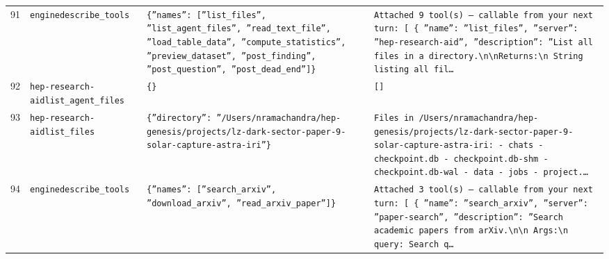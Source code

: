 \documentclass[11pt,a4paper]{article}
\begin{document}
\begin{longtable}{@{}p{}p{}p{}p{}@{}}
91 & \texttt{engine}\newline\texttt{describe\_\allowbreak{}tools} & \texttt{\{''names'':\allowbreak{} [''list\_\allowbreak{}files'',\allowbreak{} ''list\_\allowbreak{}agent\_\allowbreak{}files'',\allowbreak{} ''read\_\allowbreak{}text\_\allowbreak{}file'',\allowbreak{} ''load\_\allowbreak{}table\_\allowbreak{}data'',\allowbreak{} ''compute\_\allowbreak{}statistics'',\allowbreak{} ''preview\_\allowbreak{}dataset'',\allowbreak{} ''post\_\allowbreak{}finding'',\allowbreak{} ''post\_\allowbreak{}question'',\allowbreak{} ''post\_\allowbreak{}dead\_\allowbreak{}end'']\allowbreak{}\}\allowbreak{}} & \texttt{Attached 9 tool(s)\allowbreak{} --- callable from your next turn:\allowbreak{} [  \{   ''name'':\allowbreak{} ''list\_\allowbreak{}files'',\allowbreak{}   ''server'':\allowbreak{} ''hep-research-aid'',\allowbreak{}   ''description'':\allowbreak{} ''List all files in a directory.\textbackslash{}\allowbreak{}n\textbackslash{}\allowbreak{}nReturns:\allowbreak{}\textbackslash{}\allowbreak{}n    String listing all fil\ldots{}\allowbreak{}} \\
92 & \texttt{hep-research-aid}\newline\texttt{list\_\allowbreak{}agent\_\allowbreak{}files} & \texttt{\{\}\allowbreak{}} & \texttt{[]\allowbreak{}} \\
93 & \texttt{hep-research-aid}\newline\texttt{list\_\allowbreak{}files} & \texttt{\{''directory'':\allowbreak{} ''/\allowbreak{}Users/\allowbreak{}nramachandra/\allowbreak{}hep-genesis/\allowbreak{}projects/\allowbreak{}lz-dark-sector-paper-9-solar-capture-astra-iri''\}\allowbreak{}} & \texttt{Files in /\allowbreak{}Users/\allowbreak{}nramachandra/\allowbreak{}hep-genesis/\allowbreak{}projects/\allowbreak{}lz-dark-sector-paper-9-solar-capture-astra-iri:\allowbreak{}   - chats   - checkpoint.db   - checkpoint.db-shm   - checkpoint.db-wal   - data   - jobs   - project.\ldots{}\allowbreak{}} \\
94 & \texttt{engine}\newline\texttt{describe\_\allowbreak{}tools} & \texttt{\{''names'':\allowbreak{} [''search\_\allowbreak{}arxiv'',\allowbreak{} ''download\_\allowbreak{}arxiv'',\allowbreak{} ''read\_\allowbreak{}arxiv\_\allowbreak{}paper'']\allowbreak{}\}\allowbreak{}} & \texttt{Attached 3 tool(s)\allowbreak{} --- callable from your next turn:\allowbreak{} [  \{   ''name'':\allowbreak{} ''search\_\allowbreak{}arxiv'',\allowbreak{}   ''server'':\allowbreak{} ''paper-search'',\allowbreak{}   ''description'':\allowbreak{} ''Search academic papers from arXiv.\textbackslash{}\allowbreak{}n\textbackslash{}\allowbreak{}n    Args:\allowbreak{}\textbackslash{}\allowbreak{}n        query:\allowbreak{} Search q\ldots{}\allowbreak{}} \\

\end{longtable}
\end{document}
